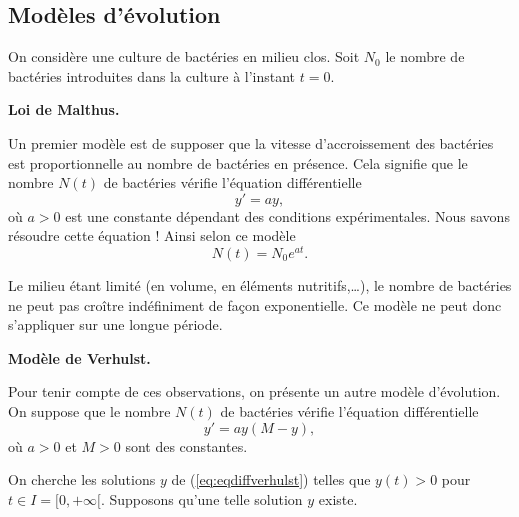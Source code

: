 \documentclass[class=report,crop=false]{standalone}
\begin{document}
\subsection{Modèles d'évolution}

On considère une culture de bactéries en milieu clos.
Soit $N_0$ le nombre de bactéries introduites dans la culture à l'instant $t = 0$.

\bigskip

\textbf{Loi de Malthus.}

Un premier modèle est de supposer que la vitesse d'accroissement des bactéries
est proportionnelle au nombre de bactéries en présence.
Cela signifie que le nombre $N(t)$ de bactéries vérifie l'équation différentielle
$$y' = ay,$$
où $a>0$ est une constante dépendant des conditions expérimentales.
Nous savons résoudre cette équation ! Ainsi selon ce modèle
$$N(t) = N_0 e^{at}.$$

Le milieu étant limité (en volume, en éléments nutritifs,\ldots),
le nombre de bactéries ne peut pas croître indéfiniment de façon exponentielle.
Ce modèle ne peut donc s'appliquer sur une longue période.

\bigskip

\textbf{Modèle de Verhulst.}

Pour tenir compte de ces observations, on présente un autre modèle d'évolution.
On suppose que le nombre $N(t)$ de bactéries vérifie l'équation différentielle
\begin{equation}
  y' = ay(M - y),
  \label{eq:eqdiffverhulst}
  \tag{$E$}
\end{equation}
où $a>0$ et $M>0$ sont des constantes.

On cherche les solutions $y$ de (\ref{eq:eqdiffverhulst}) telles que
$y(t)>0$ pour $t\in I = [0,+\infty[$.
Supposons qu'une telle solution $y$ existe.
\end{document}

